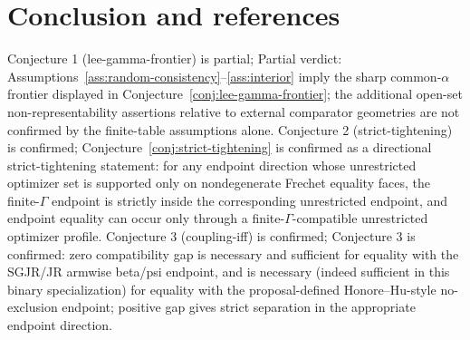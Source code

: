 \documentclass[11pt]{article}
\theoremstyle{definition}
\theoremstyle{plain}
\theoremstyle{remark}
\begin{document}
\section{Conclusion and references}
Conjecture 1 (lee-gamma-frontier) is partial; Partial verdict: Assumptions~\ref{ass:random-consistency}--\ref{ass:interior} imply the sharp common-\(\alpha\) frontier displayed in Conjecture~\ref{conj:lee-gamma-frontier}; the additional open-set non-representability assertions relative to external comparator geometries are not confirmed by the finite-table assumptions alone.
Conjecture 2 (strict-tightening) is confirmed; Conjecture~\ref{conj:strict-tightening} is confirmed as a directional strict-tightening statement: for any endpoint direction whose unrestricted optimizer set is supported only on nondegenerate Frechet equality faces, the finite-\(\Gamma\) endpoint is strictly inside the corresponding unrestricted endpoint, and endpoint equality can occur only through a finite-\(\Gamma\)-compatible unrestricted optimizer profile.
Conjecture 3 (coupling-iff) is confirmed; Conjecture 3 is confirmed: zero compatibility gap is necessary and sufficient for equality with the SGJR/JR armwise beta/psi endpoint, and is necessary (indeed sufficient in this binary specialization) for equality with the proposal-defined Honore--Hu-style no-exclusion endpoint; positive gap gives strict separation in the appropriate endpoint direction.
\end{document}
